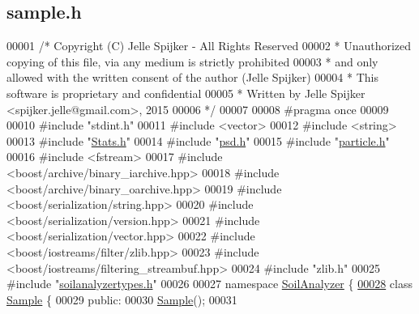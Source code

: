 \hypertarget{sample_8h_source}{}\subsection{sample.\+h}
\label{sample_8h_source}

\begin{DoxyCode}
00001 \textcolor{comment}{/* Copyright (C) Jelle Spijker - All Rights Reserved}
00002 \textcolor{comment}{ * Unauthorized copying of this file, via any medium is strictly prohibited}
00003 \textcolor{comment}{ * and only allowed with the written consent of the author (Jelle Spijker)}
00004 \textcolor{comment}{ * This software is proprietary and confidential}
00005 \textcolor{comment}{ * Written by Jelle Spijker <spijker.jelle@gmail.com>, 2015}
00006 \textcolor{comment}{ */}
00007 
00008 \textcolor{preprocessor}{#pragma once}
00009 
00010 \textcolor{preprocessor}{#include "stdint.h"}
00011 \textcolor{preprocessor}{#include <vector>}
00012 \textcolor{preprocessor}{#include <string>}
00013 \textcolor{preprocessor}{#include "\hyperlink{_stats_8h}{Stats.h}"}
00014 \textcolor{preprocessor}{#include "\hyperlink{psd_8h}{psd.h}"}
00015 \textcolor{preprocessor}{#include "\hyperlink{particle_8h}{particle.h}"}
00016 \textcolor{preprocessor}{#include <fstream>}
00017 \textcolor{preprocessor}{#include <boost/archive/binary\_iarchive.hpp>}
00018 \textcolor{preprocessor}{#include <boost/archive/binary\_oarchive.hpp>}
00019 \textcolor{preprocessor}{#include <boost/serialization/string.hpp>}
00020 \textcolor{preprocessor}{#include <boost/serialization/version.hpp>}
00021 \textcolor{preprocessor}{#include <boost/serialization/vector.hpp>}
00022 \textcolor{preprocessor}{#include <boost/iostreams/filter/zlib.hpp>}
00023 \textcolor{preprocessor}{#include <boost/iostreams/filtering\_streambuf.hpp>}
00024 \textcolor{preprocessor}{#include "zlib.h"}
00025 \textcolor{preprocessor}{#include "\hyperlink{soilanalyzertypes_8h}{soilanalyzertypes.h}"}
00026 
00027 \textcolor{keyword}{namespace }\hyperlink{namespace_soil_analyzer}{SoilAnalyzer} \{
\hypertarget{sample_8h_source_l00028}{}\hyperlink{class_soil_analyzer_1_1_sample}{00028} \textcolor{keyword}{class }\hyperlink{class_soil_analyzer_1_1_sample}{Sample} \{
00029 \textcolor{keyword}{public}:
00030   \hyperlink{class_soil_analyzer_1_1_sample_a6b7513ef6317fc86181d5b9901d0ce07}{Sample}();
00031 

\end{DoxyCode}
